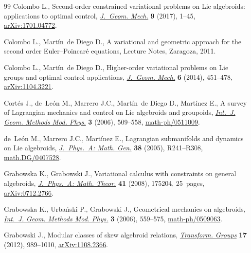 \documentclass[10pt,a4paper]{amsart}
\numberwithin{equation}{section}
\theoremstyle{definition}
\begin{document}
\begin{thebibliography}{99}
Colombo L., Second-order constrained variational problems on {L}ie algebroids:
 applications to optimal control, \href{https://doi.org/10.3934/jgm.2017001}{\textit{J.~Geom. Mech.}} \textbf{9} (2017),
 1--45, \href{https://arxiv.org/abs/1701.04772}{arXiv:1701.04772}.

Colombo L., Mart\'{i}n~de Diego D., A variational and geometric approach for
 the second order {E}uler--{P}oincar\'{e} equations, {L}ecture {N}otes,
 Zaragoza, 2011.

Colombo L., Mart\'{i}n~de Diego D., Higher-order variational problems on {L}ie
 groups and optimal control applications, \href{https://doi.org/10.3934/jgm.2014.6.451}{\textit{J.~Geom. Mech.}} \textbf{6}
 (2014), 451--478, \href{https://arxiv.org/abs/1104.3221}{arXiv:1104.3221}.

Cort\'{e}s J., de~Le\'{o}n M., Marrero J.C., Mart\'{i}n~de Diego D.,
 Mart\'{i}nez E., A survey of {L}agrangian mecha\-nics and control on {L}ie
 algebroids and groupoids, \href{https://doi.org/10.1142/S0219887806001211}{\textit{Int.~J. Geom. Methods Mod. Phys.}}
 \textbf{3} (2006), 509--558, \mbox{\href{https://arxiv.org/abs/math-ph/0511009}{math-ph/0511009}}.

de~Le\'{o}n M., Marrero J.C., Mart\'{i}nez E., Lagrangian submanifolds and
 dynamics on {L}ie algebroids, \href{https://doi.org/10.1088/0305-4470/38/24/R01}{\textit{J.~Phys.~A: Math. Gen.}} \textbf{38}
 (2005), R241--R308, \href{https://arxiv.org/abs/math.DG/0407528}{math.DG/0407528}.

Grabowska K., Grabowski J., Variational calculus with constraints on general
 algebroids, \href{https://doi.org/10.1088/1751-8113/41/17/175204}{\textit{J.~Phys.~A: Math. Theor.}} \textbf{41} (2008), 175204,
 25~pages, \href{https://arxiv.org/abs/0712.2766}{arXiv:0712.2766}.

Grabowska K., Urba\'{n}ski P., Grabowski J., Geometrical mechanics on
 algebroids, \href{https://doi.org/10.1142/S0219887806001259}{\textit{Int.~J. Geom. Methods Mod. Phys.}} \textbf{3} (2006),
 559--575, \href{https://arxiv.org/abs/math-ph/0509063}{math-ph/0509063}.

Grabowski J., Modular classes of skew algebroid relations, \href{https://doi.org/10.1007/s00031-012-9197-2}{\textit{Transform.
 Groups}} \textbf{17} (2012), 989--1010, \href{https://arxiv.org/abs/1108.2366}{arXiv:1108.2366}.


\end{thebibliography}
\end{document}
